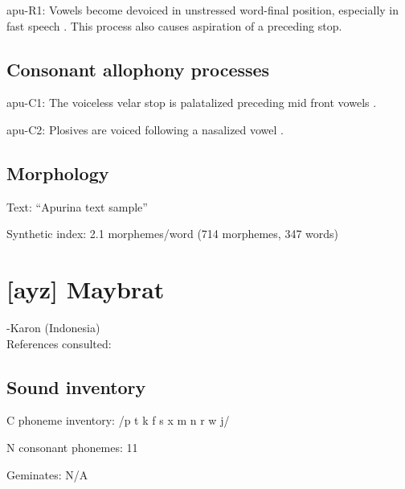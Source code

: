 {\begin{appendixdesc}
\item[apu-R1:] Vowels become devoiced in unstressed word-final position, especially in fast speech \citep[60--61]{Facundes2000}. This process also causes aspiration of a preceding stop.
\end{appendixdesc}
\subsection*{Consonant allophony processes}
\begin{appendixdesc}

\item[apu-C1:] The voiceless velar stop is palatalized preceding mid front vowels \citep[76]{Facundes2000}.

\item[apu-C2:] Plosives are voiced following a nasalized vowel \citep[73]{Facundes2000}.
\end{appendixdesc}
\subsection*{Morphology}

\begin{appendixdesc}

\item[Text:] “Apurina text sample” \citep[625--642]{Facundes2000}

\item[Synthetic index:] 2.1 morphemes/word (714 morphemes, 347 words)
\end{appendixdesc}
\section*{[ayz] Maybrat}   %
-Karon (Indonesia)\medskip\\
References consulted: \citet{Dol2007}

\subsection*{Sound inventory}
\begin{appendixdesc}

\item[C phoneme inventory:] /p t k f s x m n r w j/

\item[N consonant phonemes:] 11

\item[Geminates:] N/A


\end{appendixdesc}}
